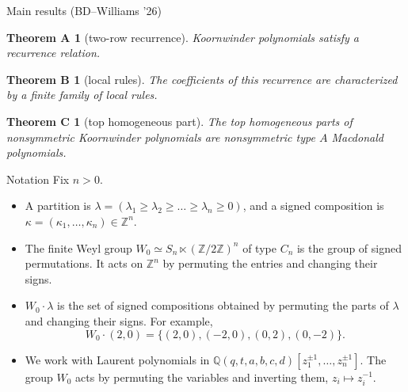 \documentclass[10pt]{beamer}
\newcommand{\notion}[1]{\textcolor{uibgreen}{#1}}
\newcommand{\ZZ}{\mathbb Z}
\newcommand{\QQ}{\mathbb Q}
\newtheorem*{thmA}{Theorem A}
\newtheorem*{thmB}{Theorem B}
\newtheorem*{thmC}{Theorem C}
\begin{document}
\begin{frame}{Main results (BD--Williams '26)}
\begin{thmA}[two-row recurrence]
Koornwinder polynomials satisfy a recurrence relation.
\end{thmA}
\begin{thmB}[local rules]
The coefficients of this recurrence are characterized by a finite family of local rules.
\end{thmB}
\begin{thmC}[top homogeneous part]
The top homogeneous parts of nonsymmetric Koornwinder polynomials are nonsymmetric type $A$ Macdonald polynomials.
\end{thmC}
\end{frame}

\begin{frame}[t]{Notation}
Fix $n>0$.
\begin{itemize}
  \item A \notion{partition} is $\lambda=(\lambda_1\ge\lambda_2\ge\dots\ge\lambda_n\ge0)$, and a \notion{signed composition} is $\kappa=(\kappa_1,\dots,\kappa_n)\in\ZZ^n$.
  \pause
  \item The finite Weyl group $W_0\simeq S_n\ltimes(\ZZ/2\ZZ)^n$ of type $C_n$ is the group of \notion{signed permutations}. It acts on $\ZZ^n$ by permuting the entries and changing their signs.
  \pause
  \item $W_0\cdot\lambda$ is the set of signed compositions obtained by permuting the parts of $\lambda$ and changing their signs. For example,
  \[
  W_0\cdot(2,0)=\{(2,0),(-2,0),(0,2),(0,-2)\}.
  \]
  \vspace{-1.2em}
  \pause
  \item We work with Laurent polynomials in $\QQ(q,t,a,b,c,d)[z_1^{\pm1},\dots,z_n^{\pm1}]$. The group $W_0$ acts by permuting the variables and inverting them, $z_i\mapsto z_i^{-1}$.

\end{itemize}
\end{frame}
\end{document}
